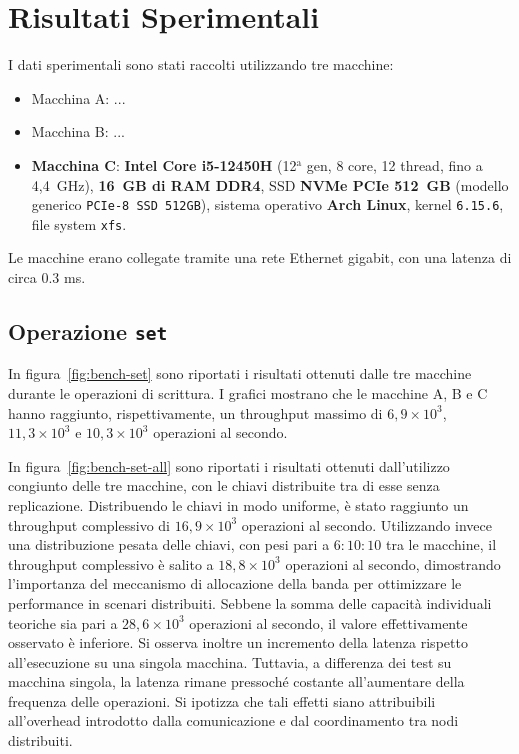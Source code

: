 \section{Risultati Sperimentali}
\label{sec:risultati}

I dati sperimentali sono stati raccolti utilizzando tre macchine:
\begin{itemize}
    \item Macchina A: ...
    \item Macchina B: ...
    \item \textbf{Macchina C}: \textbf{Intel Core i5-12450H} (12$^\text{a}$ gen, 8 core, 12 thread, fino a 4{,}4~GHz), \textbf{16~GB di RAM DDR4}, SSD \textbf{NVMe PCIe 512~GB} (modello generico \texttt{PCIe-8 SSD 512GB}), sistema operativo \textbf{Arch Linux}, kernel \texttt{6.15.6}, file system \texttt{xfs}.
\end{itemize}

Le macchine erano collegate tramite una rete Ethernet gigabit, con una latenza di circa 0.3 ms.

\subsection{Operazione \texttt{set}}
\label{subsec:risultati-set}

In figura~\ref{fig:bench-set} sono riportati i risultati ottenuti dalle tre macchine durante le operazioni di scrittura.  
I grafici mostrano che le macchine A, B e C hanno raggiunto, rispettivamente, un throughput massimo di $6{,}9 \times 10^3$, $11{,}3 \times 10^3$ e $10{,}3 \times 10^3$ operazioni al secondo.

In figura~\ref{fig:bench-set-all} sono riportati i risultati ottenuti dall'utilizzo congiunto delle tre macchine, con le chiavi distribuite tra di esse senza replicazione.  
Distribuendo le chiavi in modo uniforme, è stato raggiunto un throughput complessivo di $16{,}9 \times 10^3$ operazioni al secondo.  
Utilizzando invece una distribuzione pesata delle chiavi, con pesi pari a $6{:}10{:}10$ tra le macchine, il throughput complessivo è salito a $18{,}8 \times 10^3$ operazioni al secondo, dimostrando l'importanza del meccanismo di allocazione della banda per ottimizzare le performance in scenari distribuiti.  
Sebbene la somma delle capacità individuali teoriche sia pari a $28{,}6 \times 10^3$ operazioni al secondo, il valore effettivamente osservato è inferiore.  
Si osserva inoltre un incremento della latenza rispetto all'esecuzione su una singola macchina. Tuttavia, a differenza dei test su macchina singola, la latenza rimane pressoché costante all'aumentare della frequenza delle operazioni.  
Si ipotizza che tali effetti siano attribuibili all'overhead introdotto dalla comunicazione e dal coordinamento tra nodi distribuiti.

